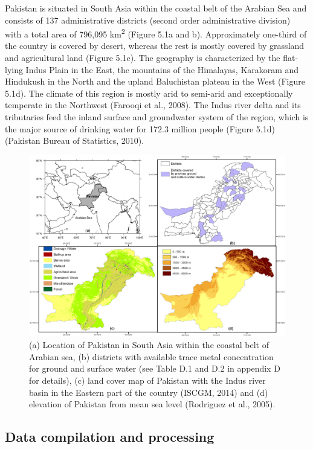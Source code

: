 Pakistan is situated in South Asia within the coastal belt of the Arabian Sea and consists of 137 administrative districts (second order administrative division) with a total area of 796,095 km\textsuperscript{2} (Figure 5.1a and b). Approximately one-third of the country is covered by desert, whereas the rest is mostly covered by grassland and agricultural land (Figure 5.1c). The geography is characterized by the flat-lying Indus Plain in the East, the mountains of the Himalayas, Karakoram and Hindukush in the North and the upland Baluchistan plateau in the West (Figure 5.1d). The climate of this region is mostly arid to semi-arid and exceptionally temperate in the Northwest (Farooqi et al., 2008). The Indus river delta and its tributaries feed the inland surface and groundwater system of the region, which is the major source of drinking water for 172.3 million people (Figure 5.1d) (Pakistan Bureau of Statistics, 2010).

\begin{figure}[h!]
  \centering
  \includegraphics[width=\textwidth]{Figures/Fig_5_1.png}
  \caption{(a) Location of Pakistan in South Asia within the coastal belt of Arabian sea, (b) districts with available trace metal concentration for ground and surface water (see Table D.1 and D.2 in appendix D for details), (c) land cover map of Pakistan with the Indus river basin in the Eastern part of the country (ISCGM, 2014) and (d) elevation of Pakistan from mean sea level (Rodriguez et al., 2005).}
  \label{Fig_5_1}
\end{figure}

\subsection{Data compilation and processing}
\label{Data compilation and processing}

